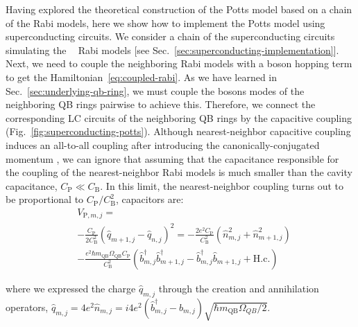 \documentclass[reprint, aps, prx, amsmath, amssymb, longbibliography, superscriptaddress]{revtex4-2}
\DeclareMathOperator{\Zthree}{\mathbb{Z}_3}
\begin{document}
Having explored the theoretical construction of the Potts model based on a chain of the Rabi models, here we show how to implement the Potts model using superconducting circuits. We consider a chain of the superconducting circuits simulating the $\Zthree$ Rabi models [see Sec.~\ref{sec:superconducting-implementation}]. Next, we need to couple the neighboring Rabi models with a boson hopping term to get the Hamiltonian~\eqref{eq:coupled-rabi}. As we have learned in Sec.~\ref{sec:underlying-qb-ring}, we must couple the bosons modes of the neighboring QB rings pairwise to achieve this. Therefore, we connect the corresponding LC circuits of the neighboring QB rings by the capacitive coupling (Fig.~\ref{fig:superconducting-potts}). Although nearest-neighbor capacitive coupling induces an all-to-all coupling after introducing the canonically-conjugated momentum \cite{forschungszentrumjulichgermany_lecture_2024}, we can ignore that assuming that the capacitance responsible for the coupling of the nearest-neighbor Rabi models is much smaller than the cavity capacitance, $C_{\text{P}} \ll C_{\text{B}}$. In this limit, the nearest-neighbor coupling turns out to be proportional to $C_{\text{P}}/C_{\text{B}}^2$, capacitors are:
\begin{align}
    &V_{\text{P},m,j} = \\
    &-\frac{C_{\text{P}}}{2C_{\text{B}}^2} (\hat q_{m+1,j} - \hat q_{n,j})^2 = -\frac{2e^2C_{\text{P}}}{C_{\text{B}}^2}\left(\hat n_{m,j}^2 + \hat n_{m+1,j}^2\right)\nonumber\\
    &- \frac{e^2\hbar m_{\text{QB}}\Omega_{\text{QB}}C_{\text{P}}}{C_{\text{B}}^2}\left(\hat b^{\dagger}_{m,j} \hat b^{\dagger}_{m+1,j} - \hat b^{\dagger}_{m,j} \hat b_{m+1,j} + \mathrm{H.c.}\right)\nonumber
\end{align}

where we expressed the charge $\hat q_{m,j}$ through the creation and annihilation operators, $\hat q_{m,j} = 4e^2\hat n_{m,j} = i4e^2(\hat b_{m,j}^{\dagger} - \hat b_{m,j})\sqrt{\hbar m_{\text{QB}} \Omega_{QB}/2}$.

\end{document}
